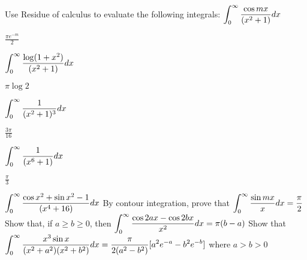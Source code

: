 \begin{problems}
\prob Use Residue of calculus to evaluate the following integrals:
\subprob  $ \displaystyle \int_0^{\infty} {\cos mx \over (x^2+1)} dx $
\begin{sol}
$\frac{\pi e^{-m}}{2}$
\end{sol}
\subprob  $ \displaystyle \int_0^{\infty} {\log (1+x^2) \over (x^2+1)} dx $
\begin{sol}
$\pi \log 2$
\end{sol}
\subprob  $ \displaystyle \int_0^{\infty} {1 \over (x^2+1)^3} dx $
\begin{sol}
$\frac{3\pi}{16}$
\end{sol}
\subprob  $ \displaystyle \int_0^{\infty} {1 \over (x^6+1)} dx $
\begin{sol}
$\frac{\pi}{3}$
\end{sol}
\subprob  $ \displaystyle \int_0^{\infty} {\cos x^2 + \sin x^2 -1 \over (x^4+16)} dx $
\prob  By contour integration, prove that $ \displaystyle \int_0^{\infty} {\sin mx \over x} dx = {\pi \over 2} $
\prob  Show that, if $a \geq b \geq 0$, then 	$ \displaystyle \int_0^{\infty} {\cos 2ax -\cos 2bx \over x^2} dx = \pi (b-a) $
\prob  Show that $ \displaystyle \int_0^{\infty} {x^3 \sin x  \over (x^2+a^2)(x^2+b^2)} dx = \frac{\pi}{2(a^2-b^2)}[a^2e^{-a}-b^2e^{-b}]$ where $a>b>0$	
\end{problems}

